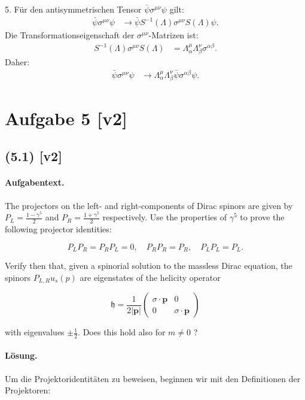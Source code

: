 \documentclass[11pt,a4paper]{article}
\begin{document}
5. Für den antisymmetrischen Tensor \(\bar{\psi} \sigma^{\mu \nu} \psi\) gilt:
\begin{align*}
\bar{\psi} \sigma^{\mu \nu} \psi &\rightarrow \bar{\psi} S^{-1}(\Lambda) \sigma^{\mu \nu} S(\Lambda) \psi.
\end{align*}
Die Transformationseigenschaft der \(\sigma^{\mu \nu}\)-Matrizen ist:
\begin{align*}
S^{-1}(\Lambda) \sigma^{\mu \nu} S(\Lambda) &= \Lambda_\alpha^\mu \Lambda_\beta^\nu \sigma^{\alpha \beta}.
\end{align*}
Daher:
\begin{align*}
\bar{\psi} \sigma^{\mu \nu} \psi &\rightarrow \Lambda_\alpha^\mu \Lambda_\beta^\nu \bar{\psi} \sigma^{\alpha \beta} \psi.
\end{align*}


\section*{Aufgabe 5 [v2]}
\subsection*{(5.1) [v2]}
\paragraph{Aufgabentext.}
The projectors on the left- and right-components of Dirac spinors are given by $P_L=\frac{1-\gamma^5}{2}$ and $P_R=\frac{1+\gamma^5}{2}$ respectively. Use the properties of $\gamma^5$ to prove the following projector identities:

$$
P_L P_R=P_R P_L=0, \quad P_R P_R=P_R, \quad P_L P_L=P_L .
$$


Verify then that, given a spinorial solution to the massless Dirac equation, the spinors $P_{L, R} u_s(p)$ are eigenstates of the helicity operator

$$
\mathfrak{h}=\frac{1}{2|\mathbf{p}|}\left(\begin{array}{cc}
\sigma \cdot \mathbf{p} & 0 \\
0 & \sigma \cdot \mathbf{p}
\end{array}\right)
$$

with eigenvalues $\pm \frac{1}{2}$. Does this hold also for $m \neq 0$ ?

\paragraph{Lösung.}
Um die Projektoridentitäten zu beweisen, beginnen wir mit den Definitionen der Projektoren:
\end{document}

